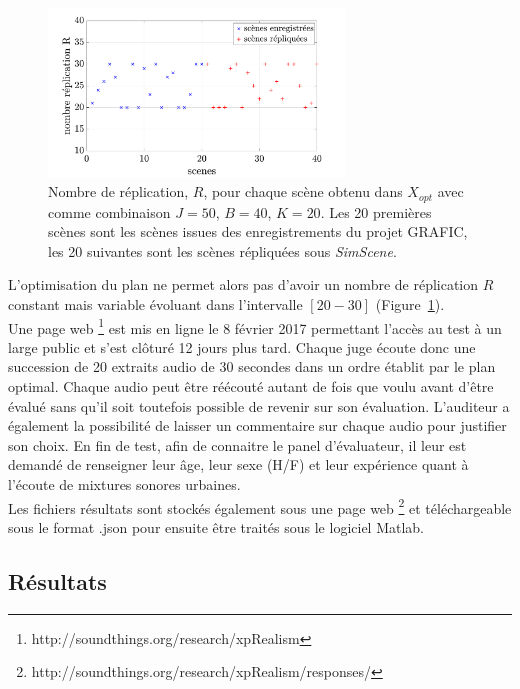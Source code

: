 \begin{figure}[ht]
\centering
\includegraphics[width = 0.7\textwidth]{./figures/test_perceptif/nb_replication.pdf}
\caption{Nombre de réplication, $R$, pour chaque scène obtenu dans $X_{opt}$ avec comme combinaison $J = 50$, $B = 40$, $K = 20$. Les 20 premières scènes sont les scènes issues des enregistrements du projet GRAFIC, les 20 suivantes sont les scènes répliquées sous \textit{SimScene}.}
\label{fig:replication}
\end{figure}

L'optimisation du plan ne permet alors pas d'avoir un nombre de réplication $R$ constant mais variable évoluant dans l'intervalle $\left[20-30 \right]$ (Figure~\ref{fig:replication}). \\

Une page web \footnote{http://soundthings.org/research/xpRealism} est mis en ligne le 8 février 2017 permettant l'accès au test à un large public et s'est clôturé 12 jours plus tard. Chaque juge écoute donc une succession de 20 extraits audio de 30 secondes dans un ordre établit par le plan optimal. Chaque audio peut être réécouté autant de fois que voulu avant d'être évalué sans qu'il soit toutefois possible de revenir sur son évaluation. L'auditeur a également la possibilité de laisser un commentaire sur chaque audio pour justifier son choix. En fin de test, afin de connaitre le panel d'évaluateur, il leur est demandé de renseigner leur âge, leur sexe (H/F) et leur expérience quant à l'écoute de mixtures sonores urbaines.\\

Les fichiers résultats sont stockés également sous une page web \footnote{http://soundthings.org/research/xpRealism/responses/} et téléchargeable sous le format .json pour ensuite être traités sous le logiciel Matlab.\\

\subsection{Résultats}

